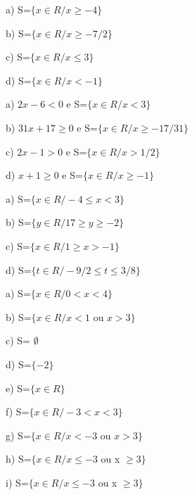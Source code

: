 \begin{respostas}{3}
    \ansitem{}
    a) S=$ \{ x \in R / x \geq -4 \} $

    b) S=$ \{ x \in R / x \geq -7/2 \} $

    c) S=$ \{ x \in R / x \leq  3 \} $
    
    d) S=$ \{ x \in R / x < -1\} $


    \ansitem{}
    a) $2x - 6 < 0$ e S=$\{x \in R / x < 3 \}$

    b) $31x + 17 \geq 0$ e S=$ \{x \in R / x \geq -17/31 \} $

    c) $2x - 1 > 0$ e S=$ \{ x \in R / x > 1/2 \} $

    d) $x + 1 \geq 0$ e S=$ \{ x \in R / x \geq -1 \} $

    \ansitem{}
    a) S=$ \{ x \in R / -4 \leq x < 3  \} $

    b) S=$ \{ y \in R / 17 \geq y \geq -2 \} $

    c) S=$ \{ x \in R / 1 \geq x > -1  \} $

    d) S=$ \{ t \in R / -9/2 \leq t \leq 3/8 \} $
\end{respostas}

\begin{respostas}{4}
    \ansitem{}
    a) S=$ \{ x \in R / 0 < x < 4 \}$

    b) S=$ \{ x \in  R / x < 1$ ou $x > 3 \}$

    c) S= $\emptyset$

    d) S=$ \{ -2 \} $

    e) S=$ \{ x \in R \} $ 

    f) S=$ \{ x \in R / -3 < x < 3 \}$

    g) S=$ \{ x \in R / x< -3$ ou $x> 3 \} $

    h) S=$ \{ x \in R / x \leq -3$ ou x $\geq 3 \} $

    i) S=$ \{ x \in R / x \leq -3$ ou x $\geq 3 \} $
\end{respostas}